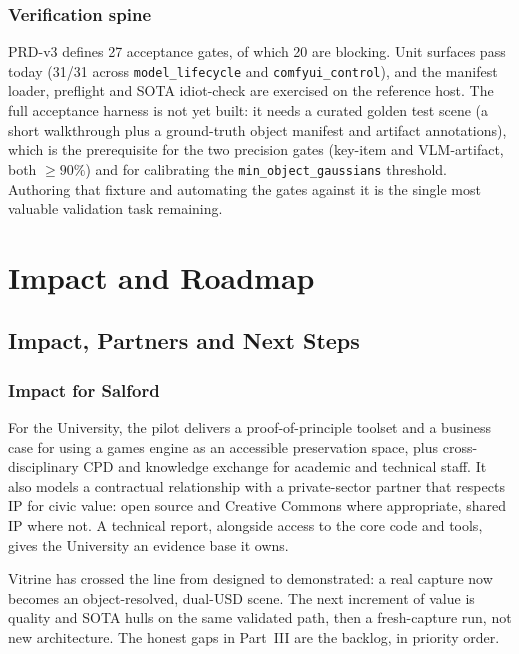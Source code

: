 \documentclass[a4paper,11pt]{report}
\newcommand{\code}[1]{\texttt{#1}}
\begin{document}
\section{Verification spine}
PRD-v3 defines 27 acceptance gates, of which 20 are blocking. Unit surfaces pass today (31/31 across
\code{model\_lifecycle} and \code{comfyui\_control}), and the manifest loader, preflight and SOTA
idiot-check are exercised on the reference host. The full acceptance harness is not yet built: it needs a
curated golden test scene (a short walkthrough plus a ground-truth object manifest and artifact
annotations), which is the prerequisite for the two precision gates (key-item and VLM-artifact, both
$\geq 90\%$) and for calibrating the \code{min\_object\_gaussians} threshold. Authoring that fixture and
automating the gates against it is the single most valuable validation task remaining.

\part{Impact and Roadmap}

\chapter{Impact, Partners and Next Steps}

\section{Impact for Salford}
For the University, the pilot delivers a proof-of-principle toolset and a business case for using a games
engine as an accessible preservation space, plus cross-disciplinary CPD and knowledge exchange for academic
and technical staff. It also models a contractual relationship with a private-sector partner that respects
IP for civic value: open source and Creative Commons where appropriate, shared IP where not. A technical
report, alongside access to the core code and tools, gives the University an evidence base it owns.

\begin{recommendation}
Vitrine has crossed the line from designed to demonstrated: a real capture now becomes an object-resolved,
dual-USD scene. The next increment of value is quality and SOTA hulls on the same validated path, then a
fresh-capture run, not new architecture. The honest gaps in Part~III are the backlog, in priority order.
\end{recommendation}
\end{document}
